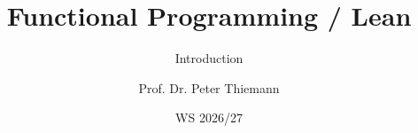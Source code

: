 
\title{Functional Programming / Lean}
\subtitle{Introduction}

\author[Peter Thiemann]{Prof. Dr. Peter Thiemann}
\date{WS 2026/27}

